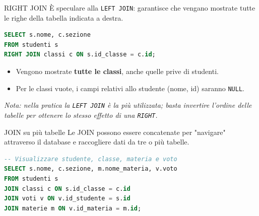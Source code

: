 \documentclass{beamer}
\begin{document}

\begin{frame}[fragile]{RIGHT JOIN}
È speculare alla \texttt{LEFT JOIN}: garantisce che vengano mostrate tutte le righe della tabella indicata a destra.

\begin{lstlisting}[language=SQL]
SELECT s.nome, c.sezione
FROM studenti s
RIGHT JOIN classi c ON s.id_classe = c.id;
\end{lstlisting}

\begin{itemize}
    \item Vengono mostrate \textbf{tutte le classi}, anche quelle prive di studenti.
    \item Per le classi vuote, i campi relativi allo studente (nome, id) saranno \texttt{NULL}.
\end{itemize}

\medskip
\textit{Nota: nella pratica la \texttt{LEFT JOIN} è la più utilizzata; basta invertire l'ordine delle tabelle per ottenere lo stesso effetto di una \texttt{RIGHT}.}
\end{frame}


\begin{frame}[fragile]{JOIN su più tabelle}
Le JOIN possono essere concatenate per "navigare" attraverso il database e raccogliere dati da tre o più tabelle.

\begin{lstlisting}[language=SQL]
-- Visualizzare studente, classe, materia e voto
SELECT s.nome, c.sezione, m.nome_materia, v.voto
FROM studenti s
JOIN classi c ON s.id_classe = c.id
JOIN voti v ON v.id_studente = s.id
JOIN materie m ON v.id_materia = m.id;
\end{lstlisting}

\end{frame}

\end{document}
